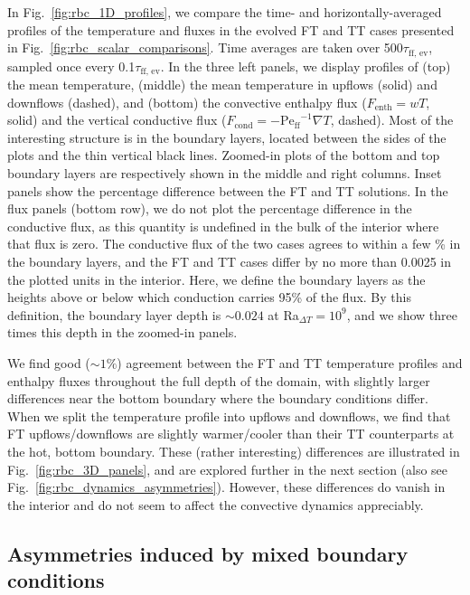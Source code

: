 \documentclass[aps, pre, onecolumn, nofootinbib, notitlepage, groupedaddress, amsfonts, amssymb, amsmath, longbibliography, superscriptaddress]{revtex4-1}
\newcommand{\grad}{\ensuremath{\nabla}}
\newcommand{\Peff}{\ensuremath{\text{Pe}_{\text{ff}}}}
\begin{document}
In Fig.~\ref{fig:rbc_1D_profiles}, we compare the time- and horizontally-averaged profiles of the temperature and fluxes in the evolved FT and TT cases presented in Fig.~\ref{fig:rbc_scalar_comparisons}.
Time averages are taken over 500$\tau_{\text{ff, ev}}$, sampled once every 0.1$\tau_{\text{ff, ev}}$.
In the three left panels, we display profiles of (top) the mean temperature, (middle) the mean temperature in upflows (solid) and downflows (dashed), and (bottom) the convective enthalpy flux ($F_{\text{enth}} = wT$, solid) and the vertical conductive flux ($F_{\text{cond}} = -\Peff^{-1}\grad T$, dashed).
Most of the interesting structure is in the boundary layers, located between the sides of the plots and the thin vertical black lines.
Zoomed-in plots of the bottom and top boundary layers are respectively shown in the middle and right columns.
Inset panels show the percentage difference between the FT and TT solutions.
In the flux panels (bottom row), we do not plot the percentage difference in the conductive flux, as this quantity is undefined in the bulk of the interior where that flux is zero.
The conductive flux of the two cases agrees to within a few \% in the boundary layers, and the FT and TT cases differ by no more than 0.0025 in the plotted units in the interior. 
Here, we define the boundary layers as the heights above or below which conduction carries 95\% of the flux.
By this definition, the boundary layer depth is $\sim 0.024$ at Ra$_{\Delta T} = 10^9$, and we show three times this depth in the zoomed-in panels.

We find good ($\sim 1\%$) agreement between the FT and TT temperature profiles and enthalpy fluxes throughout the full depth of the domain, with slightly larger differences near the bottom boundary where the boundary conditions differ.
When we split the temperature profile into upflows and downflows, we find that FT upflows/downflows are slightly warmer/cooler than their TT counterparts at the hot, bottom boundary.
These (rather interesting) differences are illustrated in Fig.~\ref{fig:rbc_3D_panels}, and are explored further in the next section (also see Fig.~\ref{fig:rbc_dynamics_asymmetries}).
However, these differences do vanish in the interior and do not seem to affect the convective dynamics appreciably.



\subsection{Asymmetries induced by mixed boundary conditions}
\label{sec:asymmetries}
\end{document}

